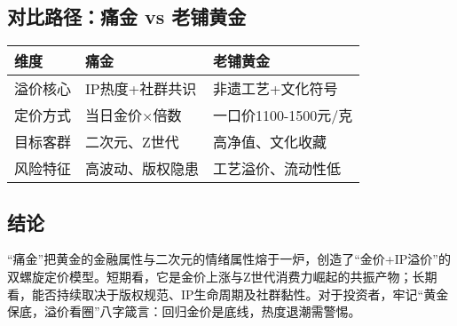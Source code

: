 \subsection{对比路径：痛金 vs 老铺黄金}
\begin{longtable}{@{}lll@{}}
\toprule
维度 & 痛金 & 老铺黄金 \\ \midrule
溢价核心 & IP热度+社群共识 & 非遗工艺+文化符号 \\
定价方式 & 当日金价×倍数 & 一口价1100-1500元/克 \\
目标客群 & 二次元、Z世代 & 高净值、文化收藏 \\
风险特征 & 高波动、版权隐患 & 工艺溢价、流动性低 \\ \bottomrule
\end{longtable}

\subsection{结论}
“痛金”把黄金的金融属性与二次元的情绪属性熔于一炉，创造了“金价+IP溢价”的双螺旋定价模型。短期看，它是金价上涨与Z世代消费力崛起的共振产物；长期看，能否持续取决于版权规范、IP生命周期及社群黏性。对于投资者，牢记“黄金保底，溢价看圈”八字箴言：回归金价是底线，热度退潮需警惕。


